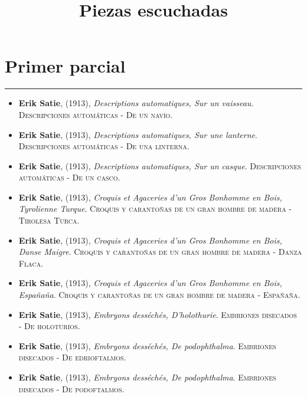 \documentclass[paper=a4, fontsize=11pt, spanish]{scrartcl}
\date{}
\title{	
\normalfont \normalsize 
\huge  Piezas escuchadas \\
\horrule{2pt}
}
\numberwithin{equation}{section} %
\numberwithin{figure}{section} %
\numberwithin{table}{section} %
\newcommand{\horrule}[1]{\rule{\linewidth}{#1}}
\begin{document}
\maketitle
\section{Primer parcial}
\horrule{0.5pt}

\begin{itemize}

\item \textbf{Erik Satie}, (1913), \textit{Descriptions automatiques, Sur un vaisseau}. \textsc{ Descripciones automáticas - De un navío}. %
\item \textbf{Erik Satie}, (1913), \textit{Descriptions automatiques, Sur une lanterne}.\textsc{ Descripciones automáticas - De una linterna}. %
\item \textbf{Erik Satie}, (1913), \textit{Descriptions automatiques, Sur un casque}.\textsc{ Descripciones automáticas - De un casco}. %
\item \textbf{Erik Satie}, (1913), \textit{Croquis et Agaceries d'un Gros Bonhomme en Bois, Tyrolienne Turque}. \textsc{ Croquis y carantoñas de un gran hombre de madera - Tirolesa Turca}. %
\item \textbf{Erik Satie}, (1913), \textit{Croquis et Agaceries d'un Gros Bonhomme en Bois, Danse Maigre}. \textsc{ Croquis y carantoñas de un gran hombre de madera - Danza Flaca}. %
\item \textbf{Erik Satie}, (1913), \textit{Croquis et Agaceries d'un Gros Bonhomme en Bois, Españaña}. \textsc{ Croquis y carantoñas de un gran hombre de madera - Españaña}. %
\item \textbf{Erik Satie}, (1913), \textit{Embryons desséchés, D'holothurie}.\textsc{ Embriones disecados - De holoturios}. %
\item \textbf{Erik Satie}, (1913), \textit{Embryons desséchés, De podophthalma}.\textsc{ Embriones disecados - De edrioftalmos}. %
\item \textbf{Erik Satie}, (1913), \textit{Embryons desséchés, De podophthalma}.\textsc{ Embriones disecados - De podoftalmos}. %

\end{itemize}
\end{document}
